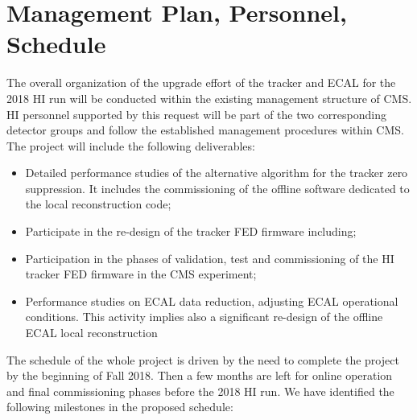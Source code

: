 \section{Management Plan, Personnel, Schedule} \label{sec:management}

The overall organization of the upgrade effort of the tracker and ECAL for the 2018 HI run will be conducted within the
existing management structure of CMS. HI personnel supported by this request will be part of the two corresponding
detector groups and follow the established management procedures within CMS. The project will include the following deliverables:

\begin{itemize}

\item Detailed performance studies of the alternative algorithm for the tracker zero suppression. It
includes the commissioning of the offline software dedicated to the local reconstruction code; 

\item Participate in the re-design of the tracker FED firmware including; 

\item Participation in the phases of validation, test and commissioning of the HI tracker FED firmware in the CMS experiment; 

\item Performance studies on ECAL data reduction, adjusting ECAL operational conditions. This activity implies also a significant re-design of the offline ECAL
local reconstruction 

\end{itemize}


%
%
The schedule of the whole project is driven by the need to complete the project by the beginning of Fall 2018. Then a
few months are left for online operation and final commissioning phases before the 2018 HI run. We have identified the
following milestones in the proposed schedule:

